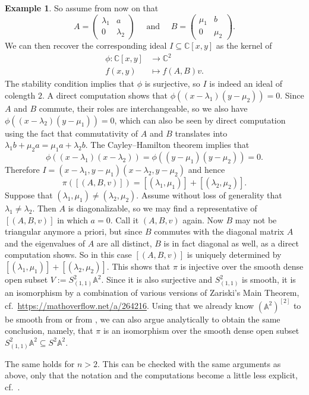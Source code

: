 \documentclass[12pt,a4paper]{amsart}
\theoremstyle{plain}
\theoremstyle{definition}
\newtheorem{exmp}[thm]{Example}
\theoremstyle{remark}
\begin{document}
\begin{exmp}
  So assume from now on that
  \[ A = \begin{pmatrix} \lambda_{1} & a \\
  0 & \lambda_{2} \end{pmatrix}
  \quad \text{ and } \quad B = \begin{pmatrix}
    \mu_{1} & b \\
    0 & \mu_{2} \end{pmatrix}.
  \]
  We can then recover the corresponding ideal $I \subseteq \mathbb{C}[x,y]$ as the kernel of
  \begin{align*}
    \phi \colon \mathbb{C}[x,y] & \longrightarrow \mathbb{C}^{2} \\
    f(x,y) & \longmapsto f(A,B)v.
  \end{align*}
  The stability condition implies that $\phi$ is surjective, so $I$ is indeed an ideal of colength $2$.
  A direct computation shows that $\phi((x-\lambda_{1})(y - \mu_{2}))= 0$.
  Since $A$ and $B$ commute, their roles are interchangeable, so we also have $\phi((x - \lambda_{2})(y - \mu_{1})) = 0$, which can also be seen by direct computation using the fact that commutativity of $A$ and $B$ translates into $\lambda_{1} b + \mu_{2} a = \mu_{1} a + \lambda_{2} b$.
  The Cayley--Hamilton theorem implies that
  \[ \phi((x - \lambda_{1})(x - \lambda_{2})) = \phi((y - \mu_{1})(y - \mu_{2})) = 0. \]
  Therefore $I = (x - \lambda_{1}, y - \mu_{1})(x - \lambda_{2}, y - \mu_{2})$ and hence
  \[ \pi([(A,B,v)]) = [(\lambda_{1}, \mu_{1})] + [(\lambda_{2}, \mu_{2})]. \]
  Suppose that $(\lambda_{1}, \mu_{1}) \neq (\lambda_{2}, \mu_{2})$.
  Assume without loss of generality that $\lambda_{1} \neq \lambda_{2}$.
  Then $A$ is diagonalizable, so we may find a representative of $[(A,B,v)]$ in which $a = 0$.
  Call it $(A,B,v)$ again.
  Now $B$ may not be triangular anymore a priori, but since $B$ commutes with the diagonal matrix $A$ and the eigenvalues of $A$ are all distinct, $B$ is in fact diagonal as well, as a direct computation shows.
  So in this case $[(A,B,v)]$ is uniquely determined by $[(\lambda_{1},\mu_{1})] + [(\lambda_{2}, \mu_{2})]$.
  This shows that $\pi$ is injective over the smooth dense open subset $V := S^{2}_{(1,1)}\mathbb{A}^{2}$.
  Since it is also surjective and $S^{2}_{(1,1)}$ is smooth, it is an isomorphism by a combination of various versions of Zariski's Main Theorem, cf.~\url{https://mathoverflow.net/a/264216}.
  Using that we already know $(\mathbb{A}^{2})^{[2]}$ to be smooth from \cite[Theorem 18.7]{ms05} or from \cite[Theorem 1.9]{nak99}, we can also argue analytically to obtain the same conclusion, namely, that $\pi$ is an isomorphism over the smooth dense open subset $S^{2}_{(1,1)}\mathbb{A}^{2} \subseteq S^{2}\mathbb{A}^{2}$.

  The same holds for $n > 2$.
  This can be checked with the same arguments as above, only that the notation and the computations become a little less explicit, cf.~\cite[Example 1.12.(4)]{nak99}.
\end{exmp}
\end{document}
